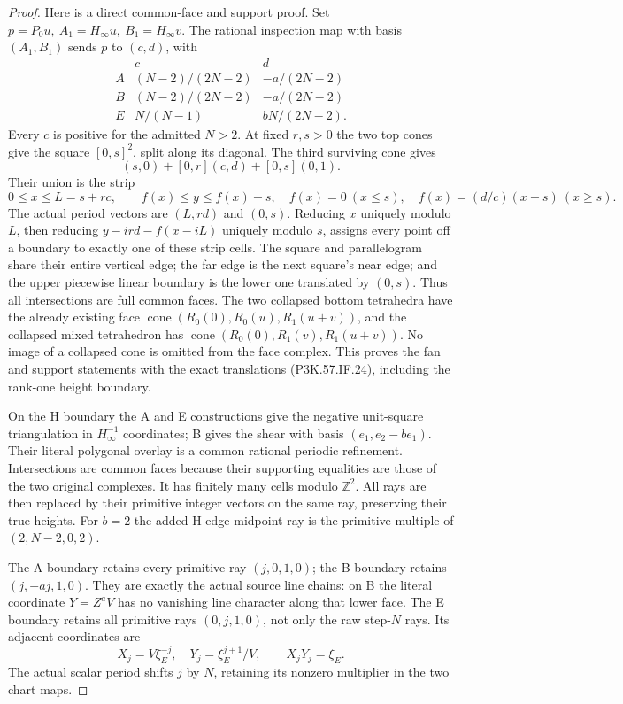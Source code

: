 \begin{proof}
Here is a direct common-face and support proof. Set
\(p=P_0u,\ A_1=H_\infty u,\ B_1=H_\infty v\).
The rational inspection map with basis \((A_1,B_1)\) sends \(p\) to
\((c,d)\), with
\[
 \begin{array}{c|cc}
 &c&d\\ \hline
 A&(N-2)/(2N-2)&-a/(2N-2)\\
 B&(N-2)/(2N-2)&-a/(2N-2)\\
 E&N/(N-1)&bN/(2N-2).
 \end{array}                                           \tag{P3K.57.IF.25}
\]
Every \(c\) is positive for the admitted \(N>2\). At fixed \(r,s>0\)
the two top cones give the square \([0,s]^2\), split along its
diagonal. The third surviving cone gives
\[
          (s,0)+[0,r](c,d)+[0,s](0,1).
\]
Their union is the strip
\[
 0\le x\le L=s+rc,\qquad f(x)\le y\le f(x)+s,\quad
 f(x)=0\ (x\le s),\quad f(x)=(d/c)(x-s)\ (x\ge s).
\]
The actual period vectors are \((L,rd)\) and \((0,s)\).
Reducing \(x\) uniquely modulo \(L\), then reducing
\(y-i rd-f(x-iL)\) uniquely modulo \(s\), assigns every point
off a boundary to exactly one of these strip cells.
The square and parallelogram share their entire vertical edge;
the far edge is the next square's near edge; and the upper
piecewise linear boundary is the lower one translated by \((0,s)\).
Thus all intersections are full common faces. The two collapsed
bottom tetrahedra have the already existing face
\(\operatorname{cone}(R_0(0),R_0(u),R_1(u+v))\), and the collapsed
mixed tetrahedron has
\(\operatorname{cone}(R_0(0),R_1(v),R_1(u+v))\).
No image of a collapsed cone is omitted from the face complex.
This proves the fan and support statements with the exact translations
(P3K.57.IF.24), including the rank-one height boundary.

On the H boundary the A and E constructions give the negative
unit-square triangulation in \(H_\infty^{-1}\) coordinates; B gives
the shear with basis \((e_1,e_2-be_1)\). Their literal polygonal
overlay is a common rational periodic refinement. Intersections
are common faces because their supporting equalities are those of
the two original complexes. It has finitely many cells modulo
\(\mathbb Z^2\). All rays are then replaced by their primitive
integer vectors on the same ray, preserving their true heights.
For \(b=2\) the added H-edge midpoint ray is the primitive multiple
of \((2,N-2,0,2)\).

The A boundary retains every primitive ray \((j,0,1,0)\); the B
boundary retains \((j,-aj,1,0)\). They are exactly the actual source
line chains: on B the literal coordinate \(Y=Z^aV\) has no vanishing
line character along that lower face. The E boundary retains all
primitive rays \((0,j,1,0)\), not only the raw step-\(N\) rays.
Its adjacent coordinates are
\[
       X_j=V\xi_E^{-j},\quad Y_j=\xi_E^{j+1}/V,\qquad
                       X_jY_j=\xi_E .                    \tag{P3K.57.IF.26}
\]
The actual scalar period shifts \(j\) by \(N\), retaining its
nonzero multiplier in the two chart maps.


\end{proof}
